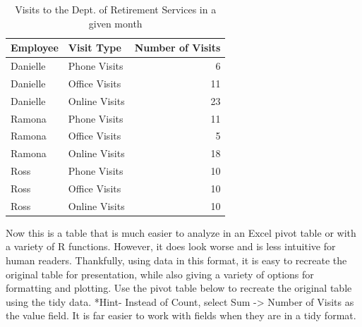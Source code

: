 \documentclass[]{book}
\newenvironment{Shaded}{\begin{snugshade}}{\end{snugshade}}
\newcommand{\CommentTok}[1]{\textcolor[rgb]{0.56,0.35,0.01}{\textit{#1}}}
\newcommand{\DataTypeTok}[1]{\textcolor[rgb]{0.13,0.29,0.53}{#1}}
\newcommand{\KeywordTok}[1]{\textcolor[rgb]{0.13,0.29,0.53}{\textbf{#1}}}
\newcommand{\NormalTok}[1]{#1}
\newcommand{\OperatorTok}[1]{\textcolor[rgb]{0.81,0.36,0.00}{\textbf{#1}}}
\newcommand{\StringTok}[1]{\textcolor[rgb]{0.31,0.60,0.02}{#1}}
\begin{document}
\begin{Shaded}
\end{Shaded}

\begin{table}

\caption{\label{tab:unnamed-chunk-3}Visits to the Dept. of Retirement Services in a given month}
\centering
\begin{tabular}[t]{l|l|r}
\hline
Employee & Visit Type & Number of Visits\\
\hline
Danielle & Phone Visits & 6\\
\hline
Danielle & Office Visits & 11\\
\hline
Danielle & Online Visits & 23\\
\hline
Ramona & Phone Visits & 11\\
\hline
Ramona & Office Visits & 5\\
\hline
Ramona & Online Visits & 18\\
\hline
Ross & Phone Visits & 10\\
\hline
Ross & Office Visits & 10\\
\hline
Ross & Online Visits & 10\\
\hline
\end{tabular}
\end{table}

Now this is a table that is much easier to analyze in an Excel pivot table or with a variety of R functions. However, it does look worse and is less intuitive for human readers. Thankfully, using data in this format, it is easy to recreate the original table for presentation, while also giving a variety of options for formatting and plotting. Use the pivot table below to recreate the original table using the tidy data. *Hint- Instead of Count, select Sum -\textgreater{} Number of Visits as the value field. It is far easier to work with fields when they are in a tidy format.
\end{document}

